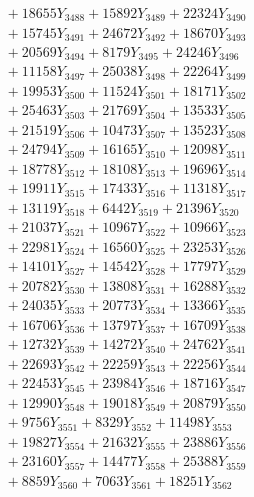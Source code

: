 \documentclass[a4paper,10pt]{article}
\begin{document}
{\begin{align}
&\;  + 18655 Y_{3488} + 15892 Y_{3489} + 22324 Y_{3490} \\[0.3ex]
&\;  + 15745 Y_{3491} + 24672 Y_{3492} + 18670 Y_{3493} \\[0.3ex]
&\;  + 20569 Y_{3494} + 8179 Y_{3495} + 24246 Y_{3496} \\[0.3ex]
&\;  + 11158 Y_{3497} + 25038 Y_{3498} + 22264 Y_{3499} \\[0.3ex]
&\;  + 19953 Y_{3500} + 11524 Y_{3501} + 18171 Y_{3502} \\[0.3ex]
&\;  + 25463 Y_{3503} + 21769 Y_{3504} + 13533 Y_{3505} \\[0.3ex]
&\;  + 21519 Y_{3506} + 10473 Y_{3507} + 13523 Y_{3508} \\[0.5ex]\allowbreak
&\;  + 24794 Y_{3509} + 16165 Y_{3510} + 12098 Y_{3511} \\[0.3ex]
&\;  + 18778 Y_{3512} + 18108 Y_{3513} + 19696 Y_{3514} \\[0.3ex]
&\;  + 19911 Y_{3515} + 17433 Y_{3516} + 11318 Y_{3517} \\[0.3ex]
&\;  + 13119 Y_{3518} + 6442 Y_{3519} + 21396 Y_{3520} \\[0.3ex]
&\;  + 21037 Y_{3521} + 10967 Y_{3522} + 10966 Y_{3523} \\[0.3ex]
&\;  + 22981 Y_{3524} + 16560 Y_{3525} + 23253 Y_{3526} \\[0.3ex]
&\;  + 14101 Y_{3527} + 14542 Y_{3528} + 17797 Y_{3529} \\[0.3ex]
&\;  + 20782 Y_{3530} + 13808 Y_{3531} + 16288 Y_{3532} \\[0.3ex]
&\;  + 24035 Y_{3533} + 20773 Y_{3534} + 13366 Y_{3535} \\[0.3ex]
&\;  + 16706 Y_{3536} + 13797 Y_{3537} + 16709 Y_{3538} \\[0.5ex]\allowbreak
&\;  + 12732 Y_{3539} + 14272 Y_{3540} + 24762 Y_{3541} \\[0.3ex]
&\;  + 22693 Y_{3542} + 22259 Y_{3543} + 22256 Y_{3544} \\[0.3ex]
&\;  + 22453 Y_{3545} + 23984 Y_{3546} + 18716 Y_{3547} \\[0.3ex]
&\;  + 12990 Y_{3548} + 19018 Y_{3549} + 20879 Y_{3550} \\[0.3ex]
&\;  + 9756 Y_{3551} + 8329 Y_{3552} + 11498 Y_{3553} \\[0.3ex]
&\;  + 19827 Y_{3554} + 21632 Y_{3555} + 23886 Y_{3556} \\[0.3ex]
&\;  + 23160 Y_{3557} + 14477 Y_{3558} + 25388 Y_{3559} \\[0.3ex]
&\;  + 8859 Y_{3560} + 7063 Y_{3561} + 18251 Y_{3562} \\[0.3ex]

\end{align}}
\end{document}
